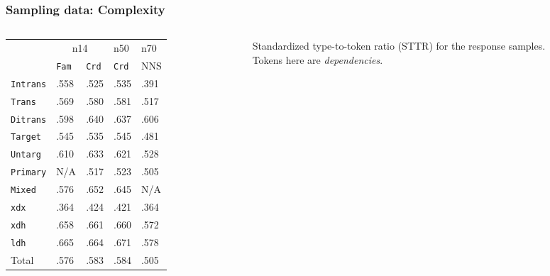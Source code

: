 \documentclass[xcolor={dvipsnames}]{beamer}
\newcommand{\param}[1]{\texttt{#1}}
\begin{document}
\begin{frame}
\frametitle{Sampling data: Complexity}
\small

\begin{columns}
\begin{column}{0.6\textwidth}
\begin{table}[htb!]
\begin{center}
\setlength{\tabcolsep}{.5em}
\begin{tabular}{|l||l|l|l||l|}
\hline
 	& \multicolumn{2}{c|}{n14} & n50 & n70 \\
\cline{2-5}
   	& \param{Fam} & \param{Crd} & \param{Crd} 			& NNS			\\ \hline
\hline
\param{Intrans} & .558 	  		& .525 			& .535 		& .391 		\\ \hline
\param{Trans}   & .569        	& .580          & .581      & .517    	    \\ \hline
\param{Ditrans} & .598        	& .640          & .637      & .606    	    \\ \hline
\hline
\param{Target}  & .545 			& .535	 		& .545 		& .481			\\ \hline
\param{Untarg}  & .610        	& .633        	& .621    	& .528        	\\ \hline
\hline
\param{Prim\-a\-ry} & N/A       & .517 			& .523		& .505		 	\\ \hline
\param{Mix\-ed}   & .576        & .652          & .645      & N/A	        \\ \hline
\hline
\param{xdx}     & .364			& .424 			& .421		& .364			\\ \hline
\param{xdh}     & .658        	& .661          & .660      & .572	        \\ \hline
\param{ldh}     & .665        	& .664          & .671      & .578	        \\ \hline
\hline
Total    		& .576        	& .583         	& .584    	& .505	        \\ \hline
\end{tabular}
\end{center}
\end{table}

\end{column}
\begin{column}{0.5\textwidth}  %
Standardized type-to-token ratio (STTR) for the response samples. \\
Tokens here are \textit{dependencies}. \\
\vspace{.8em}


\end{column}
\end{columns}
\end{frame}
\end{document}
